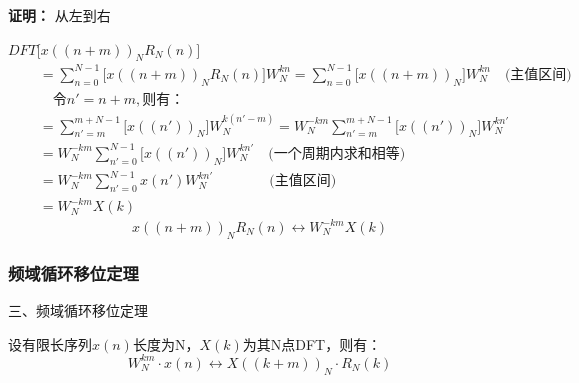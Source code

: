 \documentclass[notheorems,compress,mathserif,table]{beamer}
\begin{document}
%
%
%
\begin{frame}[shrink]\frametitle{}%
\textbf{证明：}  从左到右

$DFT\bigg[ x((n+m))_N R_N(n)\bigg]$
\begin{equation*}
\begin{split}
    \quad
         &= \sum_{n=0}^{N-1}\bigg[x((n+m))_N R_N(n)\bigg]W_N^{kn}
          = \sum_{n=0}^{N-1}\bigg[x((n+m))_N\bigg]W_N^{kn} \quad\mbox{(主值区间)}\quad\\
         &\quad  \mbox{令} n' =n+m,\mbox{则有：}  \\
         &= \sum_{n'=m}^{m+N-1}\bigg[x((n'))_N\bigg]W_N^{k(n'-m)}
          = W_N^{-km}\sum_{n'=m}^{m+N-1}\bigg[x((n'))_N\bigg]W_N^{kn'}\\
         &= W_N^{-km}\sum_{n'=0}^{N-1}\bigg[x((n'))_N\bigg]W_N^{kn'}\quad\mbox{(一个周期内求和相等)}\\
         &= W_N^{-km}\sum_{n'=0}^{N-1}x(n')W_N^{kn'}  \quad\quad\quad\quad\mbox{(主值区间)}\\
         &= W_N^{-km}X(k)
\end{split}
\end{equation*}
$$x((n+m))_N R_N(n) \longleftrightarrow W_N^{-km}X(k)$$

\end{frame}
%
%
%
\begin{frame}[shrink]\frametitle{频域循环移位定理}%
三、频域循环移位定理

设有限长序列$x(n)$长度为N，$X(k)$为其N点DFT，则有：
$$W_N^{km}\cdot x(n) \longleftrightarrow X((k+m))_N\cdot R_N(k)$$


\end{frame}
%
%
%
\end{document}
